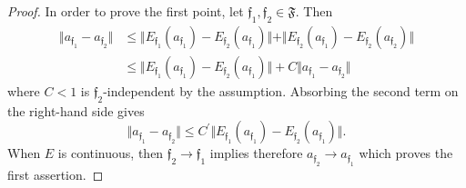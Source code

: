 \documentclass[11pt,a4paper]{scrartcl}
\numberwithin{equation}{section}
\theoremstyle{plain}
\theoremstyle{definition}
\theoremstyle{remark}
\begin{document}
\begin{proof}
In order to prove the first point, let $\mathfrak{f}_1,\mathfrak{f}_2 \in \mathfrak{F}$. Then 
\begin{align*}
\Vert a_{\mathfrak{f}_1} -a_{\mathfrak{f}_2} \Vert & \leq \Vert E_{\mathfrak{f}_1} (a_{\mathfrak{f}_1}) -E_{\mathfrak{f}_2}(a_{\mathfrak{f}_1}) \Vert + \Vert E_{\mathfrak{f}_2}(a_{\mathfrak{f}_1}) -E_{\mathfrak{f}_2}(a_{\mathfrak{f}_2}) \Vert \\
& \leq \Vert E_{\mathfrak{f}_1}(a_{\mathfrak{f}_1}) -E_{\mathfrak{f}_2}(a_{\mathfrak{f}_1}) \Vert +C \Vert a_{\mathfrak{f}_1} -a_{\mathfrak{f}_2} \Vert 
\end{align*}
where $C<1$ is $\mathfrak{f}_2$-independent by the assumption. Absorbing the second term on the right-hand side gives 
\begin{equation} \label{eq: continuity family contractions} 
\Vert a_{\mathfrak{f}_1} -a_{\mathfrak{f}_2} \Vert \leq C^\prime \Vert E_{\mathfrak{f}_1}(a_{\mathfrak{f}_1}) -E_{\mathfrak{f}_2}(a_{\mathfrak{f}_1}) \Vert.
\end{equation} 
When $E$ is continuous, then $\mathfrak{f}_2 \to \mathfrak{f}_1$ implies therefore $a_{\mathfrak{f}_2} \to a_{\mathfrak{f}_1}$ which proves the first assertion. 


\end{proof}
\end{document}
